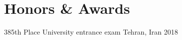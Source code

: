 \section{Honors \& Awards}

\cventry%
  {385th Place}
  {University entrance exam}
  {Tehran, Iran}{}
  {2018}{}
